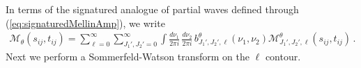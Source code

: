 In terms of the signatured analogue of partial waves defined through (\ref{eq:signaturedMellinAmp}), we write
\begin{align}
  \mathcal{M}_{\theta} ( s_{ij},t_{ij} )=
  \sum_{\ell=0}^{\infty} \sum_{J_1',J_2'=0}^{\infty}
  \int \frac{d \nu_1}{2\pi i}\,
  \frac{d \nu_2}{2\pi i}\, b_{J_1',J_2',\ell}^{\theta}(\nu_1,\nu_2) \mathcal{M}_{J_1',J_2',\ell}^{\theta}(s_{ij}, t_{ij})
  \,.
  \label{eq:partialWaveSwappedOddEven}
\end{align}
Next we  perform a Sommerfeld-Watson transform on the $ \ell $ contour.
